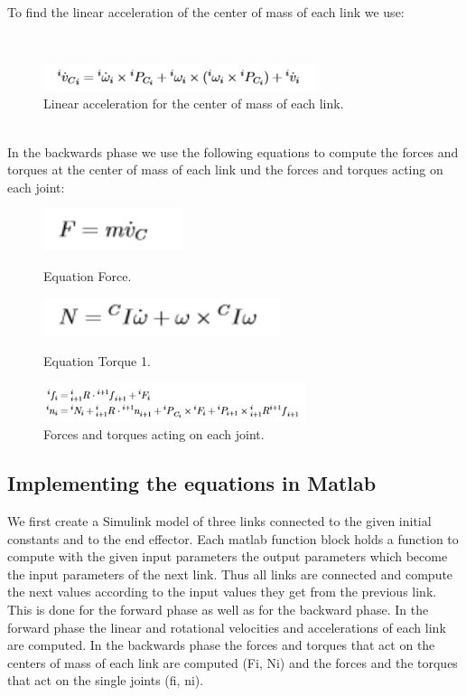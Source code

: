 \\To find the linear acceleration of the center of mass of each link we use:







\ \\
\begin{figure}[htsb]
  \centering
  \includegraphics{figures/Linear acceleration for the center of mass of each link.jpg}
  \caption{Linear acceleration for the center of mass of each link.}
\end{figure}







\\In the backwards phase we use the following equations to compute the forces and torques at the center of mass of each link und the forces and torques acting on each joint:




\begin{figure}[htsb]
  \centering
  \includegraphics{figures/Equation Force.jpg}
  \caption{Equation Force.}
 \includegraphics{figures/Equation Torque 1.jpg}
  \caption{Equation Torque 1.}
\includegraphics{figures/Forces and torques acting on each joint.jpg}
  \caption{Forces and torques acting on each joint.}
\end{figure}


  





\subsection{Implementing the equations in Matlab}
We first create a Simulink model of three links connected to the given initial constants and to the end effector. Each matlab function block holds a function to compute with the given input parameters the output parameters which become the input parameters of the next link. Thus all links are connected and compute the next values according to the input values they get from the previous link. This is done for the forward phase as well as for the backward phase. In the forward phase the linear and rotational velocities and accelerations of each link are computed. In the backwards phase the forces and torques that act on the centers of mass of each link are computed (Fi, Ni) and the forces and the torques that act on the single joints (fi, ni).



